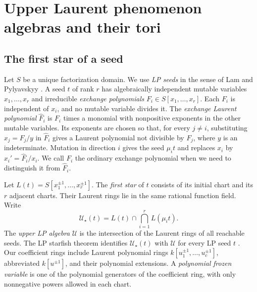 \documentclass[11pt,reqno]{amsart}
\numberwithin{equation}{section}
\theoremstyle{definition}
\theoremstyle{remark}
\begin{document}
\section{Upper Laurent phenomenon algebras and their tori}\label{sec:upper}

\subsection{The first star of a seed}

Let \(S\) be a unique factorization domain. We use \emph{LP seeds}
in the sense of Lam and Pylyavskyy \cite[\S2]{LP}. A seed \(t\) of rank \(r\)
has algebraically independent mutable variables \(x_1,\ldots,x_r\) and
irreducible \emph{exchange polynomials} \(F_i\in S[x_1,\ldots,x_r]\).
Each \(F_i\) is independent of \(x_i\), and no mutable variable divides it.
The \emph{exchange Laurent polynomial} \(\widehat F_i\) is \(F_i\) times
a monomial with nonpositive exponents in the other mutable variables. Its exponents are
chosen so that, for every \(j\ne i\), substituting \(x_j=F_j/y\)
in \(\widehat F_i\) gives a Laurent polynomial not divisible by \(F_j\),
where \(y\) is an indeterminate. Mutation in direction \(i\) gives
the seed \(\mu_i t\) and replaces \(x_i\) by \(x_i'=\widehat F_i/x_i\). We call \(F_i\)
the ordinary exchange polynomial when we need to distinguish it from
\(\widehat F_i\).

Let \(L(t)=S[x_1^{\pm1},\ldots,x_r^{\pm1}]\). The \emph{first star}
of \(t\) consists of its initial chart and its \(r\) adjacent charts.
Their Laurent rings lie in the same rational function field. Write
\[ \mathcal U_\star(t)=L(t)\cap\bigcap_{i=1}^r L(\mu_i t). \]
The \emph{upper LP algebra} \(\mathcal U\) is the intersection of the
Laurent rings of all reachable seeds. The LP starfish theorem identifies
\(\mathcal U_\star(t)\) with \(\mathcal U\) for every LP seed \(t\)
\cite[Theorem~1.3]{Branching}.
Our coefficient rings include Laurent polynomial rings
\(k[u_1^{\pm1},\ldots,u_c^{\pm1}]\), abbreviated \(k[u^{\pm1}]\),
and their polynomial extensions. A \emph{polynomial frozen variable}
is one of the polynomial generators of the coefficient ring, with
only nonnegative powers allowed in each chart.
\end{document}

